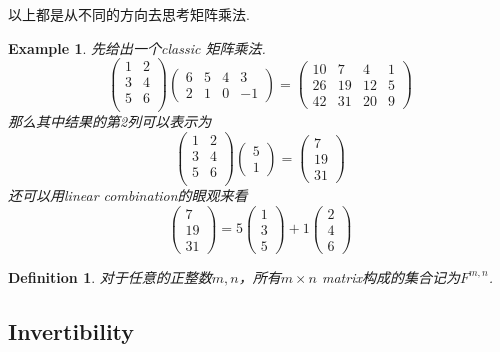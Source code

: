 \documentclass{article}
\newtheorem{example}[theorem]{Example}
\newtheorem{definition}[theorem]{Definition}
\begin{document}
以上都是从不同的方向去思考矩阵乘法.

\begin{example}
\rm 先给出一个classic 矩阵乘法.
$$
\begin{pmatrix}
1 & 2 \\
3 & 4 \\
5 & 6 \\
\end{pmatrix}
\begin{pmatrix}
6 & 5 & 4 & 3 \\
2 & 1 & 0 & -1
\end{pmatrix} = 
\begin{pmatrix}
10 & 7 & 4 & 1 \\
26 & 19 & 12 & 5 \\
42 & 31 & 20 & 9
\end{pmatrix}
$$
那么其中结果的第2列可以表示为
$$
\begin{pmatrix}
1 & 2 \\
3 & 4 \\
5 & 6 \\
\end{pmatrix}
\begin{pmatrix}
5 \\
1 
\end{pmatrix} = 
\begin{pmatrix}
7 \\
19 \\
31 
\end{pmatrix}
$$
还可以用linear combination的眼观来看
$$
\begin{pmatrix}
7 \\
19 \\
31 
\end{pmatrix} =
5\begin{pmatrix}
1 \\
3 \\
5 
\end{pmatrix} + 
1 \begin{pmatrix}
2 \\
4 \\
6
\end{pmatrix}
$$
\end{example}

\begin{definition}
对于任意的正整数$m,n$，所有$m \times n$ matrix构成的集合记为$F^{m,n}$.
\end{definition}

\newpage
\subsection{Invertibility}
\end{document}
